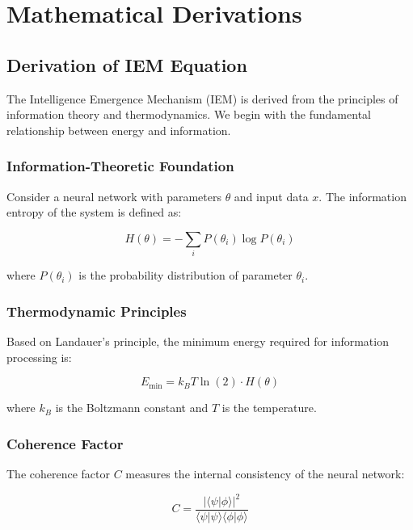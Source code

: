 \documentclass[12pt]{article}
\begin{document}
\appendix

\section{Mathematical Derivations}

\subsection{Derivation of IEM Equation}

The Intelligence Emergence Mechanism (IEM) is derived from the principles of information theory and thermodynamics. We begin with the fundamental relationship between energy and information.

\subsubsection{Information-Theoretic Foundation}

Consider a neural network with parameters $\theta$ and input data $x$. The information entropy of the system is defined as:

\begin{equation}
H(\theta) = -\sum_{i} P(\theta_i) \log P(\theta_i)
\end{equation}

where $P(\theta_i)$ is the probability distribution of parameter $\theta_i$.

\subsubsection{Thermodynamic Principles}

Based on Landauer's principle, the minimum energy required for information processing is:

\begin{equation}
E_{\min} = k_B T \ln(2) \cdot H(\theta)
\end{equation}

where $k_B$ is the Boltzmann constant and $T$ is the temperature.

\subsubsection{Coherence Factor}

The coherence factor $C$ measures the internal consistency of the neural network:

\begin{equation}
C = \frac{|\langle \psi | \phi \rangle|^2}{\langle \psi | \psi \rangle \langle \phi | \phi \rangle}
\end{equation}
\end{document}
